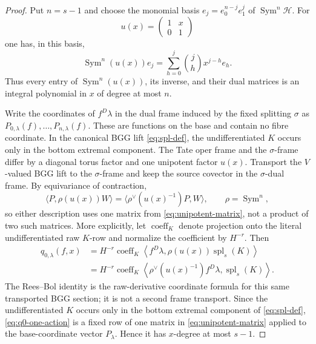\documentclass[11pt]{article}
\theoremstyle{definition}
\theoremstyle{remark}
\newcommand{\Sym}{\operatorname{Sym}}
\newcommand{\calH}{\mathcal H}
\begin{document}
\begin{proof}
Put $n=s-1$ and choose the monomial basis
$e_j=e_0^{n-j}e_1^j$ of $\Sym^n\calH$.  For
\[
 u(x)=\begin{pmatrix}1&x\\0&1\end{pmatrix}
\]
one has, in this basis,
\begin{equation}\label{eq:unipotent-matrix}
 \Sym^n(u(x))e_j
 =\sum_{h=0}^j\binom{j}{h}x^{j-h}e_h.
\end{equation}
Thus every entry of $\Sym^n(u(x))$, its inverse, and their dual matrices is
an integral polynomial in $x$ of degree at most $n$.

Write the coordinates of $f^D\lambda$ in the dual frame induced by the fixed
splitting $\sigma$ as
$P_{0,\lambda}(f),\ldots,P_{n,\lambda}(f)$.  These are functions on the base
and contain no fibre coordinate.  In the canonical BGG lift
\eqref{eq:spl-def}, the undifferentiated $K$ occurs only in the bottom
extremal component.  The Tate oper frame and the $\sigma$-frame differ by a
diagonal torus factor and one unipotent factor $u(x)$.  Transport the
$V$-valued BGG lift to the $\sigma$-frame and keep the source covector in the
$\sigma$-dual frame.  By equivariance of contraction,
\[
 \langle P,\rho(u(x))W\rangle
 =\langle\rho^\vee(u(x)^{-1})P,W\rangle,
 \qquad \rho=\Sym^n,
\]
so either description uses one matrix from \eqref{eq:unipotent-matrix}, not a
product of two such matrices.  More explicitly, let $\operatorname{coeff}_{K}$ denote projection onto
the literal undifferentiated raw $K$-row and normalize the coefficient by
$H^{-r}$.  Then
\begin{align}
 q_{0,\lambda}(f,x)
 &=H^{-r}\operatorname{coeff}_{K}
   \left\langle f^D\lambda,
     \rho(u(x))\operatorname{spl}_s(K)\right\rangle\label{eq:q0-one-action}\\
 &=H^{-r}\operatorname{coeff}_{K}
   \left\langle\rho^\vee(u(x)^{-1})f^D\lambda,
     \operatorname{spl}_s(K)\right\rangle.\nonumber
\end{align}
The Rees--Bol identity is the raw-derivative coordinate formula for this same
transported BGG section; it is not a second frame transport.  Since the
undifferentiated $K$ occurs only in the bottom extremal component of
\eqref{eq:spl-def}, \eqref{eq:q0-one-action} is a fixed row of one matrix in
\eqref{eq:unipotent-matrix} applied to the base-coordinate vector
$P_\lambda$.  Hence it has $x$-degree at most $s-1$.


\end{proof}
\end{document}
